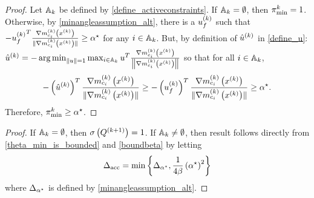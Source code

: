 
\begin{proof}
Let ${\mathbb A_{k}}$ be defined by \cref{define_activeconstraints}.
If ${\mathbb A_{k}} = \emptyset$, then ${\pi^k_{\textrm{min}}} = 1$.
Otherwise, by \cref{minangleassumption_alt}, there is a ${u^{(k)}_f}$ such that 
$-{u^{(k)}_f}^T\frac{{\nabla m_{c_i}^{(k)}\left(x^{(k)}\right)}}{\|{\nabla m_{c_i}^{(k)}\left(x^{(k)}\right)}\|} \ge { \alpha^{\star} }$ for any $i \in {\mathbb A_{k}}$.
But, by definition of ${{\hat u}^{(k)}}$ in \cref{define_u}:
${{\hat u}^{(k)}} = -\operatorname*{arg\,min}_{\|u\| = 1} \max_{i \in {\mathbb A_{k}}} u^T\frac{{\nabla m_{c_i}^{(k)}\left(x^{(k)}\right)}}{\left\|{\nabla m_{c_i}^{(k)}\left(x^{(k)}\right)}\right\|}$
so that for all $i \in {\mathbb A_{k}}$,
\begin{align*}
-\left({{\hat u}^{(k)}}\right)^T\frac{{\nabla m_{c_i}^{(k)}\left(x^{(k)}\right)}}{\|{\nabla m_{c_i}^{(k)}\left(x^{(k)}\right)}\|}  \ge -\left({u^{(k)}_f}\right)^T\frac{{\nabla m_{c_i}^{(k)}\left(x^{(k)}\right)}}{\|{\nabla m_{c_i}^{(k)}\left(x^{(k)}\right)}\|} \ge { \alpha^{\star} }.
\end{align*}
Therefore, ${\pi^k_{\textrm{min}}} \ge { \alpha^{\star} }$.
\end{proof}

\begin{proof}
If ${\mathbb A_{k}} = \emptyset$, then 
${\sigma} \left({Q^{(k+1)}}\right) = 1$.
If ${\mathbb A_{k}} \ne \emptyset$, then result follows directly from \cref{theta_min_is_bounded} and \cref{boundbeta} by letting
\begin{align}
{\Delta_{\textrm{acc}}} = \min\left\{{\Delta_{\alpha^{\star}}}, \frac 1 {4 \beta} \left({ \alpha^{\star} } \right)^2 \right\} \label{define_delta_accuracy}
\end{align}
where ${\Delta_{\alpha^{\star}}}$ is defined by \cref{minangleassumption_alt}.
\end{proof}


